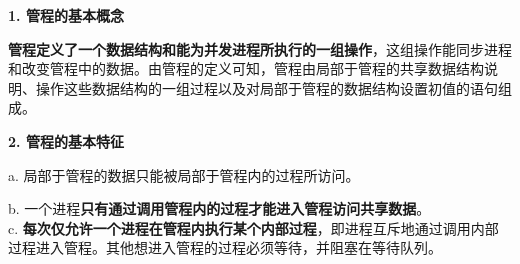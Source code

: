 {\textbf{1. 管程的基本概念}}

{\textbf{管程定义了一个数据结构和能为并发进程所执行的一组操作}，这组操作能同步进程和改变管程中的数据。由管程的定义可知，管程由局部于管程的共享数据结构说明、操作这些数据结构的一组过程以及对局部于管程的数据结构设置初值的语句组成。}

{\textbf{2. 管程的基本特征}}

a. 局部于管程的数据只能被局部于管程内的过程所访问。

b.
一个进程{\textbf{只有通过调用管程内的过程才能进入管程访问共享数据}}。\\

{c.
}{\textbf{每次仅允许一个进程在管程内执行某个内部过程}}{，即进程互斥地通过调用内部过程进入管程。其他想进入管程的过程必须等待，并阻塞在等待队列。}

